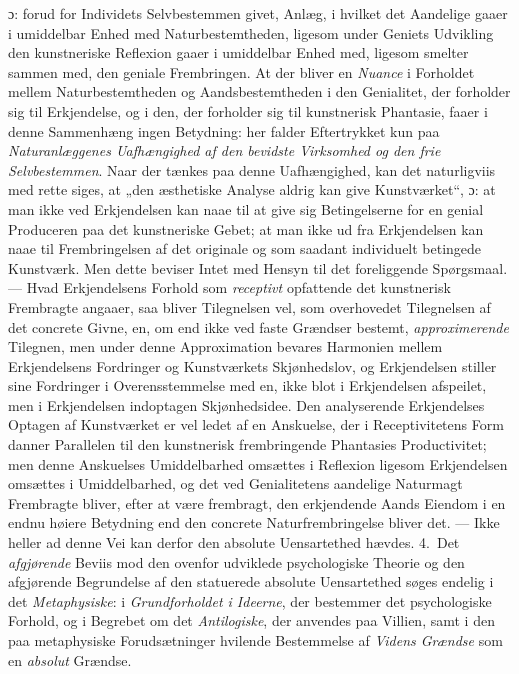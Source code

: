\documentclass[12pt,a4paper]{book}
\newcommand{\opage}[1]{\marginnote{\footnotesize\textit{[#1]}}}
\begin{document}
ɔ: forud for Individets Selvbestemmen givet, Anlæg, i hvilket det Aandelige gaaer
\opage{152}i umiddelbar Enhed med Naturbestemtheden, ligesom under Geniets Udvikling den
kunstneriske Reflexion gaaer i umiddelbar Enhed med, ligesom smelter sammen med, den
geniale Frembringen. At der bliver en \emph{Nuance} i Forholdet mellem Naturbestemtheden og
Aandsbestemtheden i den Genialitet, der forholder sig til Erkjendelse, og i den, der
forholder sig til kunstnerisk Phantasie, faaer i denne Sammenhæng ingen Betydning: her
falder Eftertrykket kun paa \emph{Naturanlæggenes Uafhængighed af den bevidste
Virksomhed og den frie Selvbestemmen}. Naar der tænkes paa denne Uafhængighed, kan det
naturligviis med rette siges, at „den æsthetiske Analyse aldrig kan give Kunstværket“,
ɔ: at man ikke ved Erkjendelsen kan naae til at give sig Betingelserne for en genial
Produceren paa det kunstneriske Gebet; at man ikke ud fra Erkjendelsen kan naae til
Frembringelsen af det originale og som saadant individuelt betingede Kunstværk. Men dette
beviser Intet med Hensyn til det foreliggende Spørgsmaal. --- Hvad Erkjendelsens Forhold
som \emph{receptivt} opfattende det kunstnerisk Frembragte angaaer, saa bliver Tilegnelsen vel,
som overhovedet Tilegnelsen af det concrete Givne, en, om end ikke ved faste Grændser
bestemt, \emph{approximerende} Tilegnen, men under denne Approximation bevares Harmonien mellem
Erkjendelsens Fordringer og Kunstværkets Skjønhedslov, og Erkjendelsen stiller sine
Fordringer i Overensstemmelse med en, ikke blot i Erkjendelsen afspeilet, men i
Erkjendelsen indoptagen Skjønhedsidee. Den analyserende Erkjendelses Optagen af
Kunstværket er vel ledet af en Anskuelse, der i Receptivitetens Form danner Parallelen til
den kunstnerisk frembringende Phantasies Productivitet; men denne Anskuelses Umiddelbarhed
omsættes i Reflexion ligesom Erkjendelsen omsættes i Umiddelbarhed, og det ved
Genialitetens aandelige Naturmagt Frembragte bliver, efter at være frembragt, den
erkjendende Aands Eiendom i en endnu høiere Betydning end den concrete Naturfrembringelse bliver det. --- Ikke heller ad denne Vei kan derfor den absolute Uensartethed hævdes.
\opage{153}4.~Det \emph{afgjørende} Beviis mod den ovenfor udviklede psychologiske Theorie og den
afgjørende Begrundelse af den statuerede absolute Uensartethed søges endelig i det
\emph{Metaphysiske}: i \emph{Grundforholdet i Ideerne}, der bestemmer det psychologiske
Forhold, og i Begrebet om det \emph{Antilogiske}, der anvendes paa Villien, samt i den paa
metaphysiske Forudsætninger hvilende Bestemmelse af \emph{Videns Grændse} som en \emph{absolut} Grændse.
\end{document}
